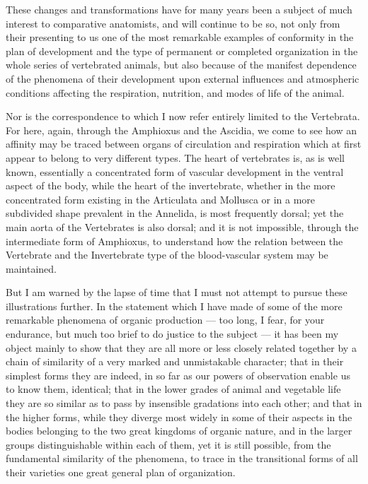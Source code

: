 \documentclass[a4paper, 11pt, oneside, english]{article}
\begin{document}
These changes and transformations have for many years been a subject of much interest to comparative anatomists, and will continue to be so, not only from their presenting to us one of the most remarkable examples of conformity in the plan of development and the type of permanent or completed organization in the whole series of vertebrated animals, but also because of the manifest dependence of the phenomena of their development upon external influences and atmospheric conditions affecting the respiration, nutrition, and modes of life of the animal.

Nor is the correspondence to which I now refer entirely limited to the Vertebrata. For here, again, through the Amphioxus and the Ascidia, we come to see how an affinity may be traced between organs of circulation and respiration which at first appear to belong to very different types. The heart of vertebrates is, as is well known, essentially a concentrated form of vascular development in the ventral aspect of the body, while the heart of the invertebrate, whether in the more concentrated form existing in the Articulata and Mollusca or in a more subdivided shape prevalent in the Annelida, is most frequently dorsal; yet the main aorta of the Vertebrates is also dorsal; and it is not impossible, through the intermediate form of Amphioxus, to understand how the relation between the Vertebrate and the Invertebrate type of the blood-vascular system may be maintained.

But I am warned by the lapse of time that I must not attempt to pursue these illustrations further. In the statement which I have made of some of the more remarkable phenomena of organic production --- too long, I fear, for your endurance, but much too brief to do justice to the subject --- it has been my object mainly to show that they are all more or less closely related together by a chain of similarity of a very marked and unmistakable character; that in their simplest forms they are indeed, in so far as our powers of observation enable us to know them, identical; that in the lower grades of animal and vegetable life they are so similar as to pass by insensible gradations into each other; and that in the higher forms, while they diverge most widely in some of their aspects in the bodies belonging to the two great kingdoms of organic nature, and in the larger groups distinguishable within each of them, yet it is still possible, from the fundamental similarity of the phenomena, to trace in the transitional forms of all their varieties one great general plan of organization.
\end{document}
